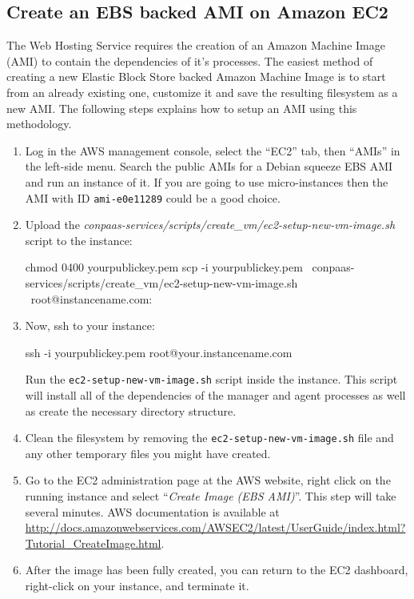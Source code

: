 \documentclass[10pt]{article}
\begin{document}
\subsection{Create an EBS backed AMI on Amazon EC2}

The Web Hosting Service requires the creation of an Amazon Machine
Image (AMI) to contain the dependencies of it's processes.  The
easiest method of creating a new Elastic Block Store backed Amazon
Machine Image is to start from an already existing one, customize it
and save the resulting filesystem as a new AMI. The following steps
explains how to setup an AMI using this methodology.

\begin{enumerate}
\item Log in the AWS management console, select the ``EC2'' tab, then
  ``AMIs'' in the left-side menu. Search the public AMIs for a Debian
  squeeze EBS AMI and run an instance of it. If you are going to use
  micro-instances then the AMI with ID \verb+ami-e0e11289+ could be a
  good choice.

\item Upload the \textit{conpaas-services/scripts/create\_vm/ec2-setup-new-vm-image.sh} script to the instance:
  \begin{code}
    chmod 0400 yourpublickey.pem
    scp -i yourpublickey.pem \
      conpaas-services/scripts/create_vm/ec2-setup-new-vm-image.sh \
      root@instancename.com:
  \end{code}

\item Now, ssh to your instance:
  \begin{code}
    ssh -i yourpublickey.pem root@your.instancename.com
  \end{code}
  Run the \verb+ec2-setup-new-vm-image.sh+ script inside the instance.
  This script will install all of the dependencies of the manager and
  agent processes as well as create the necessary directory structure.

\item Clean the filesystem by removing the
  \verb+ec2-setup-new-vm-image.sh+ file and any other temporary files you might
  have created.

\item Go to the EC2 administration page at the AWS website, right
  click on the running instance and select ``\emph{Create Image (EBS
    AMI)}''.  This step will take several minutes. AWS documentation
  is available at
  \url{http://docs.amazonwebservices.com/AWSEC2/latest/UserGuide/index.html?Tutorial\_CreateImage.html}.

\item After the image has been fully created, you can return to the
  EC2 dashboard, right-click on your instance, and terminate it.
\end{enumerate}
\end{document}
